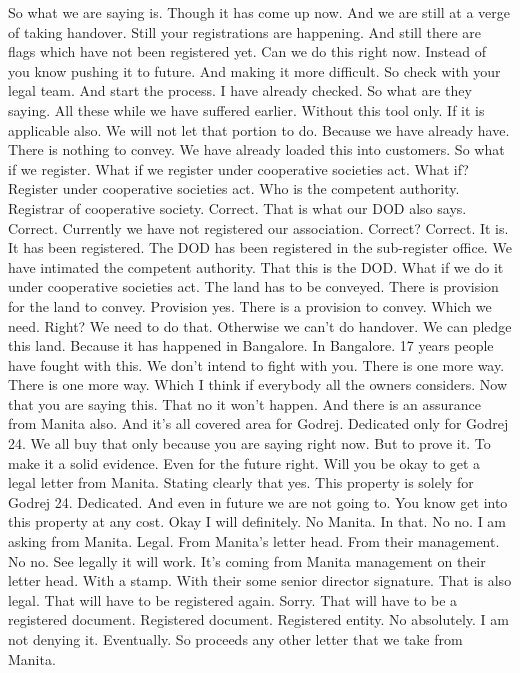 So what we are saying is.
Though it has come up now.
And we are still at a verge of taking handover.
Still your registrations are happening.
And still there are flags which have not been registered yet.
Can we do this right now.
Instead of you know pushing it to future.
And making it more difficult.
So check with your legal team.
And start the process.
I have already checked.
So what are they saying.
All these while we have suffered earlier.
Without this tool only.
If it is applicable also.
We will not let that portion to do.
Because we have already have.
There is nothing to convey.
We have already loaded this into customers.
So what if we register.
What if we register under cooperative societies act.
What if?
Register under cooperative societies act.
Who is the competent authority.
Registrar of cooperative society.
Correct.
That is what our DOD also says.
Correct.
Currently we have not registered our association.
Correct?
Correct.
It is.
It has been registered.
The DOD has been registered in the sub-register office.
We have intimated the competent authority.
That this is the DOD.
What if we do it under cooperative societies act.
The land has to be conveyed.
There is provision for the land to convey.
Provision yes.
There is a provision to convey.
Which we need.
Right?
We need to do that.
Otherwise we can't do handover.
We can pledge this land.
Because it has happened in Bangalore.
In Bangalore.
17 years people have fought with this.
We don't intend to fight with you.
There is one more way.
There is one more way.
Which I think if everybody all the owners considers.
Now that you are saying this.
That no it won't happen.
And there is an assurance from Manita also.
And it's all covered area for Godrej.
Dedicated only for Godrej 24.
We all buy that only because you are saying right now.
But to prove it.
To make it a solid evidence.
Even for the future right.
Will you be okay to get a legal letter from Manita.
Stating clearly that yes.
This property is solely for Godrej 24.
Dedicated.
And even in future we are not going to.
You know get into this property at any cost.
Okay I will definitely.
No Manita.
In that.
No no.
I am asking from Manita.
Legal.
From Manita's letter head.
From their management.
No no.
See legally it will work.
It's coming from Manita management on their letter head.
With a stamp.
With their some senior director signature.
That is also legal.
That will have to be registered again.
Sorry.
That will have to be a registered document.
Registered document.
Registered entity.
No absolutely.
I am not denying it.
Eventually.
So proceeds any other letter that we take from Manita.
